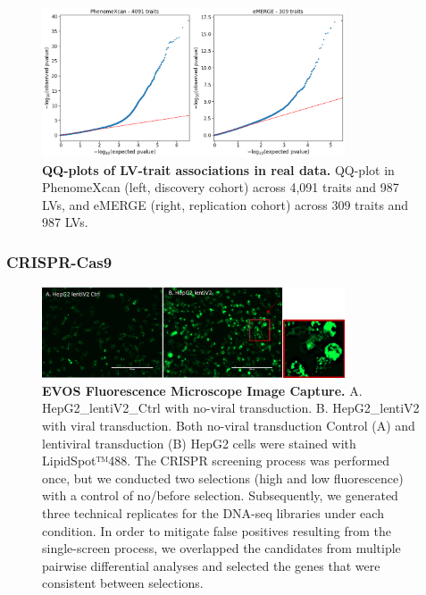 \documentclass[
  a4paper,
]{article}
\newenvironment{fignos:tagged-figure}[1][]{
  \let\oldfigurename\figurename
  \renewcommand{\figurename}{Supplementary Figure}
}{
  \let\figurename\oldfigurename
}
\begin{document}
\begin{fignos:tagged-figure}[S7]

\begin{figure}
\hypertarget{fig:reg:real:qqplots}{%
\centering
\includegraphics[width=0.8\textwidth,height=\textheight]{images/gls/real_data/qqplots.png}
\caption{\textbf{QQ-plots of LV-trait associations in real data.}
QQ-plot in PhenomeXcan (left, discovery cohort) across 4,091 traits and 987 LVs, and eMERGE (right, replication cohort) across 309 traits and 987 LVs.}\label{fig:reg:real:qqplots}
}
\end{figure}

\end{fignos:tagged-figure}

\clearpage

\hypertarget{crispr-cas9}{%
\subsubsection{CRISPR-Cas9}\label{crispr-cas9}}

\begin{fignos:tagged-figure}[S8]

\begin{figure}
\hypertarget{fig:sup:crispr:fig1}{%
\centering
\includegraphics[width=0.8\textwidth,height=\textheight]{images/crispr/figure1.png}
\caption{\textbf{EVOS Fluorescence Microscope Image Capture.}
A. HepG2\_lentiV2\_Ctrl with no-viral transduction.
B. HepG2\_lentiV2 with viral transduction.
Both no-viral transduction Control (A) and lentiviral transduction (B) HepG2 cells were stained with LipidSpot™488.
The CRISPR screening process was performed once, but we conducted two selections (high and low fluorescence) with a control of no/before selection. Subsequently, we generated three technical replicates for the DNA-seq libraries under each condition. In order to mitigate false positives resulting from the single-screen process, we overlapped the candidates from multiple pairwise differential analyses and selected the genes that were consistent between selections.}\label{fig:sup:crispr:fig1}
}
\end{figure}

\end{fignos:tagged-figure}
\end{document}
